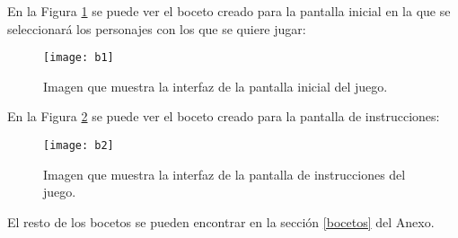 En la Figura \ref{figura-b1} se puede ver el boceto creado para la pantalla inicial en la que se seleccionará los personajes con los que se quiere jugar:

\begin{figure}[h]
  \centering
  \texttt{[image: b1]}
  \caption{Imagen que muestra la interfaz de la pantalla inicial del juego.\protect\footnotemark}
  \label{figura-b1}
\end{figure}

\newpage

En la Figura \ref{figura-b2} se puede ver el boceto creado para la pantalla de instrucciones:

\begin{figure}[h]
  \centering
  \texttt{[image: b2]}
  \caption{Imagen que muestra la interfaz de la pantalla de instrucciones del juego.\protect\footnotemark}
  \label{figura-b2}
\end{figure}

El resto de los bocetos se pueden encontrar en la sección \ref{bocetos} del Anexo.

